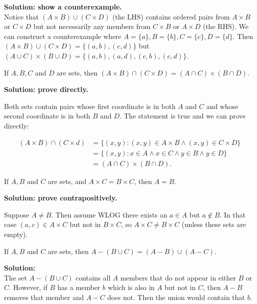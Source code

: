 \documentclass{article}
\begin{document}
\textbf{Solution: show a counterexample.}
\\
Notice that $(A \times B) \cup (C \times D)$ (the LHS) contains ordered pairs from $A \times B$ or $C \times D$ but not necessarily any members from $C \times B$ or $A \times D$ (the RHS). We can construct a counterexample where $A = \{a\}, B = \{b\}, C = \{c\}, D = \{d\}$. Then $(A \times B) \cup (C \times D) = \{(a, b), (c, d)\}$ but $(A \cup C) \times (B \cup D) = \{(a, b), (a, d), (c, b), (c, d)\}$.

\begin{problem}
If $A, B, C$ and $D$ are sets, then $(A \times B) \cap (C \times D) = (A \cap C) \times (B \cap D)$.
\end{problem}

\textbf{Solution: prove directly.}

Both sets contain pairs whose first coordinate is in both $A$ and $C$ and whose second coordinate is in both $B$ and $D$. The statement is true and we can prove directly:

\begin{align*}
  (A \times B) \cap (C \times d) & = \{(x, y): (x, y) \in A \times B \land (x, y) \in C \times D\} \\
                                 & = \{(x, y): x \in A \land x \in C \land y \in B \land y \in D\} \\
                                 & = (A \cap C) \times (B \cap D).
\end{align*}

\begin{problem}
If $A, B$ and $C$ are sets, and $A \times C = B \times C$, then $A = B$.
\end{problem}

\textbf{Solution: prove contrapositively.}

Suppose $A \neq B$. Then assume WLOG there exists an $a \in A$ but $a \not\in B$. In that case $(a, c) \in A \times C$ but not in $B \times C$, so $A \times C \neq B \times C$ (unless these sets are empty).

\begin{problem}
If $A, B$ and $C$ are sets, then $A - (B \cup C) = (A - B) \cup (A - C)$.
\end{problem}

\textbf{Solution:}
\\
The set $A - (B\cup C)$ contains all $A$ members that do not appear in either $B$ or $C$. However, if $B$ has a member $b$ which is also in $A$ but not in $C$, then $A - B$ removes that member and $A - C$ does not. Then the union would contain that $b$.
\end{document}
